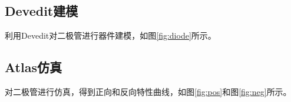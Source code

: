 \documentclass[12pt, a4paper, oneside]{ctexart}
\begin{document}
    \subsection{Devedit建模}
    利用Devedit对二极管进行器件建模，如图\ref{fig:diode}所示。
 

    \subsection{Atlas仿真}
    对二极管进行仿真，得到正向和反向特性曲线，如图\ref{fig:pos}和图\ref{fig:neg}所示。

    
    
\end{document}
